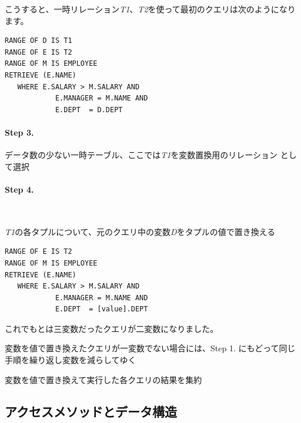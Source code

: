 こうすると、一時リレーション{\it T1}、{\it T2}を使って最初のクエリは次のようになります。

\begin{center}
 \begin{minipage}{0.8\textwidth}
  \begin{lstlisting}
RANGE OF D IS T1
RANGE OF E IS T2
RANGE OF M IS EMPLOYEE
RETRIEVE (E.NAME)
   WHERE E.SALARY > M.SALARY AND
            E.MANAGER = M.NAME AND
            E.DEPT  = D.DEPT
  \end{lstlisting}
 \end{minipage}
\end{center}

\paragraph{Step 3.}
データ数の少ない一時テーブル、ここでは{\it T1}を変数置換用のリレーション
として選択

\paragraph{Step 4.} \ 


{\it T1}の各タプルについて、元のクエリ中の変数{\it D}をタプルの値で置き換える

\begin{center}
 \begin{minipage}{0.8\textwidth}
  \begin{lstlisting}
RANGE OF E IS T2
RANGE OF M IS EMPLOYEE
RETRIEVE (E.NAME)
   WHERE E.SALARY > M.SALARY AND
            E.MANAGER = M.NAME AND
            E.DEPT  = [value].DEPT
  \end{lstlisting}
 \end{minipage}
\end{center}

これでもとは三変数だったクエリが二変数になりました。


変数を値で置き換えたクエリが一変数でない場合には、Step 1. にもどって同じ手順を繰り返し変数を減らしてゆく


変数を値で置き換えて実行した各クエリの結果を集約


\subsection{アクセスメソッドとデータ構造}


